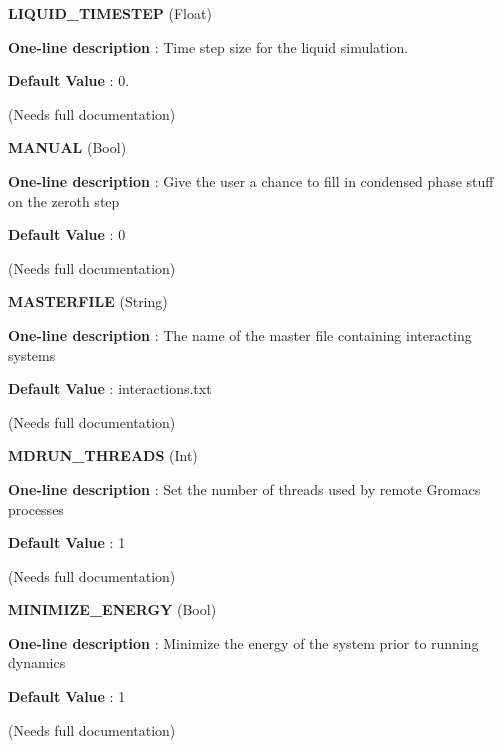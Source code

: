 \begin{DoxyItemize}
\item {\bfseries  \-L\-I\-Q\-U\-I\-D\-\_\-\-T\-I\-M\-E\-S\-T\-E\-P } (\-Float) \par
{\bfseries  \-One-\/line description }\-: \-Time step size for the liquid simulation. \par
{\bfseries  \-Default \-Value }\-: 0. \par
(\-Needs full documentation)\end{DoxyItemize}
\begin{DoxyItemize}
\item {\bfseries  \-M\-A\-N\-U\-A\-L } (\-Bool) \par
{\bfseries  \-One-\/line description }\-: \-Give the user a chance to fill in condensed phase stuff on the zeroth step \par
{\bfseries  \-Default \-Value }\-: 0 \par
(\-Needs full documentation)\end{DoxyItemize}
\begin{DoxyItemize}
\item {\bfseries  \-M\-A\-S\-T\-E\-R\-F\-I\-L\-E } (\-String) \par
{\bfseries  \-One-\/line description }\-: \-The name of the master file containing interacting systems \par
{\bfseries  \-Default \-Value }\-: interactions.\-txt \par
(\-Needs full documentation)\end{DoxyItemize}
\begin{DoxyItemize}
\item {\bfseries  \-M\-D\-R\-U\-N\-\_\-\-T\-H\-R\-E\-A\-D\-S } (\-Int) \par
{\bfseries  \-One-\/line description }\-: \-Set the number of threads used by remote \-Gromacs processes \par
{\bfseries  \-Default \-Value }\-: 1 \par
(\-Needs full documentation)\end{DoxyItemize}
\begin{DoxyItemize}
\item {\bfseries  \-M\-I\-N\-I\-M\-I\-Z\-E\-\_\-\-E\-N\-E\-R\-G\-Y } (\-Bool) \par
{\bfseries  \-One-\/line description }\-: \-Minimize the energy of the system prior to running dynamics \par
{\bfseries  \-Default \-Value }\-: 1 \par
(\-Needs full documentation)\end{DoxyItemize}
